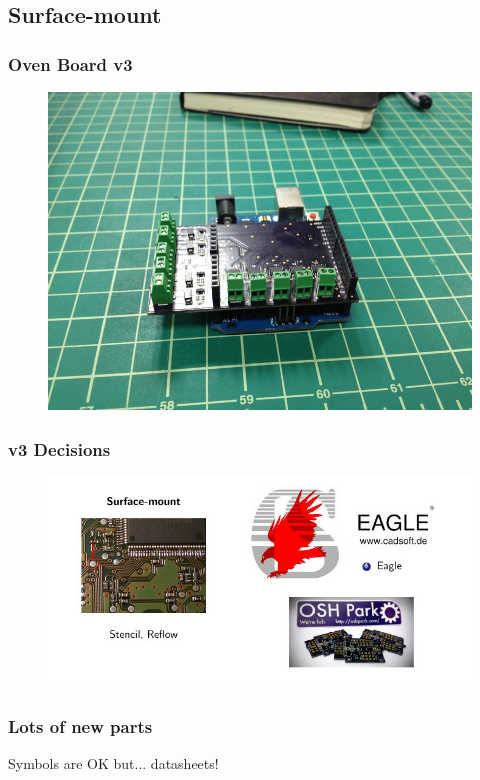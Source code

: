 \documentclass{beamer}
\begin{document}
\subsection{Surface-mount}
\begin{frame}
\frametitle{Oven Board v3}
\begin{figure}
\includegraphics[width=0.8\linewidth]{ovenboard3-side.png}
\end{figure}
\end{frame}

\begin{frame}
\frametitle{v3 Decisions}
\begin{figure}
\includegraphics[width=1.0\linewidth]{decisions2.jpg}
\end{figure}
\end{frame}


\begin{frame}
\frametitle{Lots of new parts}
Symbols are OK but... datasheets!
\end{frame}
\end{document}
